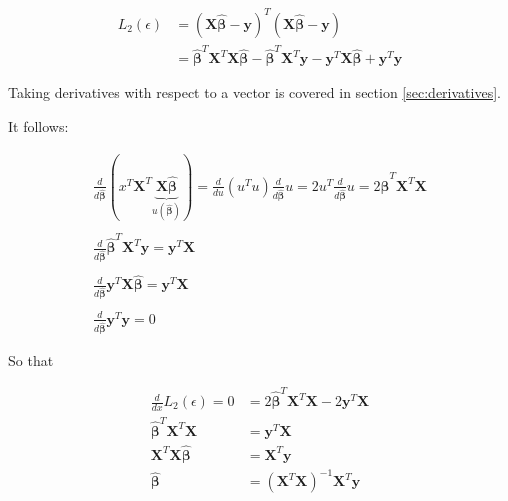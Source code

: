 \begin{equation}
\begin{array}{rl}
L_2(\epsilon) &= \left(\mathbf{X}\mathbf{\hat{\beta}}-\mathbf{y}\right)^T\left(\mathbf{X}\mathbf{\hat{\beta}}-\mathbf{y}\right)\\
&= \mathbf{\hat{\beta}}^T\mathbf{X}^T\mathbf{X}\mathbf{\hat{\beta}} - \mathbf{\hat{\beta}}^T\mathbf{X}^T\mathbf{y} - \mathbf{y}^T\mathbf{X}\mathbf{\hat{\beta}} + \mathbf{y}^T\mathbf{y}
\end{array}
\end{equation}

Taking derivatives with respect to a vector is covered in section \ref{sec:derivatives}.

It follows:

\begin{equation}
\begin{array}{l}
\frac{d}{d\mathbf{\hat{\beta}}}\left(x^T\mathbf{X}^T\underbrace{\mathbf{X}\mathbf{\hat{\beta}}}_{u(\mathbf{\hat{\beta}})}\right) = \frac{d}{du}\left(u^Tu\right)\frac{d}{d\mathbf{\hat{\beta}}}u = 2u^T\frac{d}{d\mathbf{\hat{\beta}}}u = 2\mathbf{\hat{\beta}}^T\mathbf{X}^T\mathbf{X}\\
\\
\frac{d}{d\mathbf{\hat{\beta}}}\mathbf{\hat{\beta}}^T\mathbf{X}^T\mathbf{y} = \mathbf{y}^T\mathbf{X}\\
\\
\frac{d}{d\mathbf{\hat{\beta}}}\mathbf{y}^T\mathbf{X}\mathbf{\hat{\beta}} = \mathbf{y}^T\mathbf{X}\\
\\
\frac{d}{d\mathbf{\hat{\beta}}}\mathbf{y}^T\mathbf{y} = 0
\end{array}
\end{equation}

So that

\begin{equation}
\begin{array}{rl}
\frac{d}{dx}L_2(\epsilon) = 0 &= 2\mathbf{\hat{\beta}}^T\mathbf{X}^T\mathbf{X} - 2\mathbf{y}^T\mathbf{X}\\
\mathbf{\hat{\beta}}^T\mathbf{X}^T\mathbf{X} &= \mathbf{y}^T\mathbf{X}\\
\mathbf{X}^T\mathbf{X}\mathbf{\hat{\beta}} &= \mathbf{X}^T\mathbf{y}\\
\mathbf{\hat{\beta}} &= \left(\mathbf{X}^T\mathbf{X}\right)^{-1}\mathbf{X}^T\mathbf{y}
\end{array}
\end{equation}



